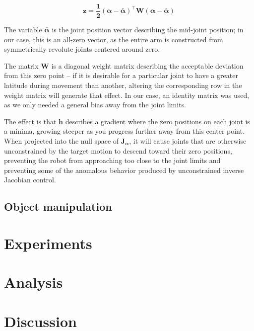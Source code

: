 \documentclass[10pt, conference]{IEEEtran}
\begin{document}
\begin{itemize}
     \begin{equation}
     \label{eq:z}
     \mathbf{ z = \frac{1}{2}(\alpha - \bar{\alpha})^{\top}W(\alpha -
     \bar{\alpha})}
     \end{equation}

     The variable \(\mathbf{\bar{\alpha}}\) is the joint position vector
     describing the mid-joint position; in our case, this is an all-zero
     vector, as the entire arm is constructed from symmetrically
     revolute joints centered around zero.

     The matrix \( \mathbf{W} \) is a diagonal weight matrix describing
     the acceptable deviation from this zero point -- if it is desirable
     for a particular joint to have a greater latitude during movement
     than another, altering the corresponding row in the weight matrix
     will generate that effect. In our case, an identity matrix was
     used, as we only needed a general bias away from the joint limits.

     The effect is that \(\mathbf{h}\) describes a gradient where the
     zero positions on each joint is a minima, growing steeper as you
     progress further away from this center point. When projected into
     the null space of \(\mathbf{J_\alpha}\), it will cause joints that
     are otherwise unconstrained by the target motion to descend toward
     their zero positions, preventing the robot from approaching too
     close to the joint limits and preventing some of the anomalous
     behavior produced by unconstrained inverse Jacobian control.

\end{itemize} %
\subsection{Object manipulation}
\label{sec-3-4}
\section{Experiments}
\label{sec-4}
\section{Analysis}
\label{sec-5}
\section{Discussion}
\label{sec-6}
\end{document}
